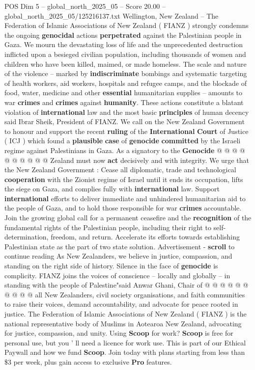 \begin{textsample}{POS Dim 5 – global\_north\_2025\_05 – Score 20.00 – global\_north\_2025\_05/125216137.txt}  \label{ex:f5_pos_074}
Wellington, New Zealand -- The Federation of Islamic Associations of New Zealand ( FIANZ ) strongly condemns the ongoing \textbf{genocidal} actions \textbf{perpetrated} against the Palestinian people in Gaza.
We mourn the devastating loss of life and the unprecedented destruction inflicted upon a besieged civilian population, including thousands of women and children who have been killed, maimed, or made homeless.
The scale and nature of the violence -- marked by \textbf{indiscriminate} bombings and systematic targeting of health workers, aid workers, hospitals and refugee camps, and the blockade of food, water, medicine and other \textbf{essential} humanitarian supplies -- amounts to war \textbf{crimes} and \textbf{crimes} against \textbf{humanity}.
These actions constitute a blatant violation of \textbf{international} law and the most basic \textbf{principles} of human decency said Ibrar Sheik, President of FIANZ.
We call on the New Zealand Government to honour and support the recent \textbf{ruling} of the \textbf{International} \textbf{Court} of Justice ( ICJ ) which found a \textbf{plausible} \textbf{case} of \textbf{genocide} \textbf{committed} by the Israeli regime against Palestinians in Gaza.
As a signatory to the \textbf{Genocide} @ @ @ @ @ @ @ @ @ @ Zealand must now \textbf{act} decisively and with integrity.
We urge that the New Zealand Government : Cease all diplomatic, trade and technological \textbf{cooperation} with the Zionist regime of Israel until it ends its occupation, lifts the siege on Gaza, and complies fully with \textbf{international} law.
Support \textbf{international} efforts to deliver immediate and unhindered humanitarian aid to the people of Gaza, and to hold those responsible for war \textbf{crimes} accountable.
Join the growing global call for a permanent ceasefire and the \textbf{recognition} of the fundamental rights of the Palestinian people, including their right to self-determination, freedom, and return.
Accelerate its efforts towards establishing Palestinian state as the part of two state solution.
Advertisement - \textbf{scroll} to continue reading As New Zealanders, we believe in justice, compassion, and standing on the right side of history.
Silence in the face of \textbf{genocide} is complicity.
FIANZ joins the voices of conscience -- locally and globally -- in standing with the people of Palestine"said Anwar Ghani, Chair of @ @ @ @ @ @ @ @ @ @ all New Zealanders, civil society organisations, and faith communities to raise their voices, demand accountability, and advocate for peace rooted in justice.
The Federation of Islamic Associations of New Zealand ( FIANZ ) is the national representative body of Muslims in Aotearoa New Zealand, advocating for justice, compassion, and unity.
Using \textbf{Scoop} for work? \textbf{Scoop} is free for personal use, but you ' ll need a licence for work use.
This is part of our Ethical Paywall and how we fund \textbf{Scoop}.
Join today with plans starting from less than \$3 per week, plus gain access to exclusive \textbf{Pro} features.


\end{textsample}
